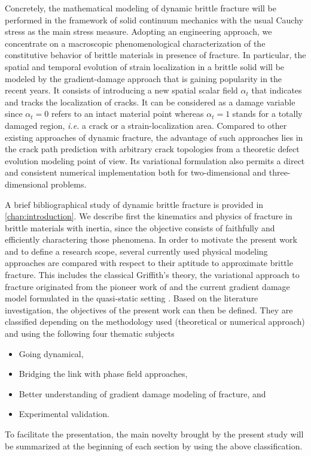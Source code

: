Concretely, the mathematical modeling of dynamic brittle fracture will be performed in the framework of solid continuum mechanics with the usual Cauchy stress as the main stress measure. Adopting an engineering approach, we concentrate on a macroscopic phenomenological characterization of the constitutive behavior of brittle materials in presence of fracture. In particular, the spatial and temporal evolution of strain localization in a brittle solid will be modeled by the gradient-damage approach that is gaining popularity in the recent years. It consists of introducing a new spatial scalar field $\alpha_t$ that indicates and tracks the localization of cracks. It can be considered as a damage variable since $\alpha_t=0$ refers to an intact material point whereas $\alpha_t=1$ stands for a totally damaged region, \emph{i.e.} a crack or a strain-localization area. Compared to other existing approaches of dynamic fracture, the advantage of such approaches lies in the crack path prediction with arbitrary crack topologies from a theoretic defect evolution modeling point of view. Its variational formulation also permits a direct and consistent numerical implementation both for two-dimensional and three-dimensional problems.

A brief bibliographical study of dynamic brittle fracture is provided in \cref{chap:introduction}. We describe first the kinematics and physics of fracture in brittle materials with inertia, since the objective consists of faithfully and efficiently charactering those phenomena. In order to motivate the present work and to define a research scope, several currently used physical modeling approaches are compared with respect to their aptitude to approximate brittle fracture. This includes the classical Griffith's theory, the variational approach to fracture originated from the pioneer work of \cite{FrancfortMarigo:1998} and the current gradient damage model formulated in the quasi-static setting \cite{PhamMarigo:2010-1}. Based on the literature investigation, the objectives of the present work can then be defined. They are classified depending on the methodology used (theoretical or numerical approach) and using the following four thematic subjects
\begin{itemize}
\item Going dynamical,
\item Bridging the link with phase field approaches,
\item Better understanding of gradient damage modeling of fracture, and
\item Experimental validation.
\end{itemize}
To facilitate the presentation, the main novelty brought by the present study will be summarized at the beginning of each section by using the above classification.

